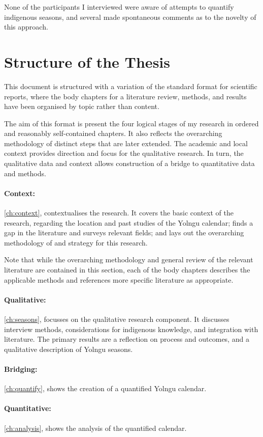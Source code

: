 None of the participants I interviewed were aware of attempts to quantify indigenous seasons,
and several made spontaneous comments as to the novelty of this approach.





\section{Structure of the Thesis}

This document is structured with a variation of the standard format for scientific reports,
where the body chapters for a literature review, methods, and results
have been organised by topic rather than content.

The aim of this format is present the four logical stages of my research
in ordered and reasonably self-contained chapters.
It also reflects the overarching methodology of distinct steps that are
later extended.  The academic and local context provides direction and focus
for the qualitative research.  In turn, the qualitative data and context
allows construction of a bridge to quantitative data and methods.


\paragraph{Context:}
\autoref{ch:context}, \textit{} contextualises the research.
It covers the basic context of the research,
regarding the location and past studies of the Yolngu calendar;
finds a gap in the literature and surveys relevant fields;
and lays out the overarching methodology of and strategy for this research.

Note that while the overarching methodology and general review of the relevant literature
are contained in this section, each of the body chapters describes the applicable methods
and references more specific literature as appropriate.


\paragraph{Qualitative:}
\autoref{ch:seasons}, \textit{} focusses on the qualitative research component.
It discusses interview methods, considerations for indigenous knowledge, and integration with literature.
The primary results are a reflection on process and outcomes,
and a qualitative description of Yolngu seasons.


\paragraph{Bridging:}
\autoref{ch:quantify}, \textit{} shows the creation of a quantified Yolngu calendar.


\paragraph{Quantitative:}
\autoref{ch:analysis}, \textit{} shows the analysis of the quantified calendar.

